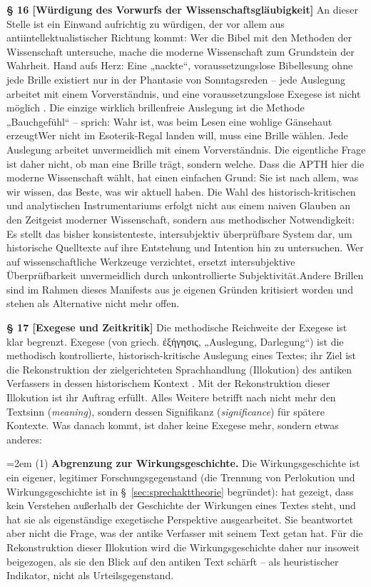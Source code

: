 \documentclass[11pt,a4paper]{article}
\makeatletter
\newcommand{\apth}{{\apthfont APTH}\hspace{0.15em}\xspace}
\newcommand{\subpar}[1]{%
  \begingroup
  \leftskip=2em %
  \noindent#1\par
  \endgroup
}
\newcommand{\apthsec}[3]{%
  \phantomsection%
  \def\@currentlabel{#1}%
  \label{sec:#3}%
  \textbf{§ #1 [#2]}%
}
\makeatother
\begin{document}
\apthsec{16}{Würdigung des Vorwurfs der Wissenschaftsgläubigkeit}{wissenschaftsglaeubigkeit} An dieser Stelle ist ein Einwand aufrichtig zu würdigen, der vor allem aus antiintellektualistischer Richtung kommt: Wer die Bibel mit den Methoden der Wissenschaft untersuche, mache die moderne Wissenschaft zum Grundstein der Wahrheit. Hand aufs Herz: Eine „nackte“, voraussetzungslose Bibellesung ohne jede Brille existiert nur in der Phantasie von Sonntagsreden – jede Auslegung arbeitet mit einem Vorverständnis, und eine voraussetzungslose Exegese ist nicht möglich \citep{bultmann1957,gadamer1960}. Die einzige wirklich brillenfreie Auslegung ist die Methode „Bauchgefühl“ – sprich: Wahr ist, was beim Lesen eine wohlige Gänsehaut erzeugt\textinterrobang\space Wer nicht im Esoterik-Regal landen will, muss eine Brille wählen. Jede Auslegung arbeitet unvermeidlich mit einem Vorverständnis. Die eigentliche Frage ist daher nicht, ob man eine Brille trägt, sondern welche. Dass die \apth hier die moderne Wissenschaft wählt, hat einen einfachen Grund: Sie ist nach allem, was wir wissen, das Beste, was wir aktuell haben. Die Wahl des historisch-kritischen und analytischen Instrumentariums erfolgt nicht aus einem naiven Glauben an den Zeitgeist moderner Wissenschaft, sondern aus methodischer Notwendigkeit: Es stellt das bisher konsistenteste, intersubjektiv überprüfbare System dar, um historische Quelltexte auf ihre Entstehung und Intention hin zu untersuchen. Wer auf wissenschaftliche Werkzeuge verzichtet, ersetzt intersubjektive Überprüfbarkeit unvermeidlich durch unkontrollierte Subjektivität.Andere Brillen sind im Rahmen dieses Manifests aus je eigenen Gründen kritisiert worden und stehen als Alternative nicht mehr offen.

\apthsec{17}{Exegese und Zeitkritik}{exegese-zeitkritik} Die methodische Reichweite der Exegese ist klar begrenzt. Exegese (von griech. ἐξήγησις, „Auslegung, Darlegung“) ist die methodisch kontrollierte, historisch-kritische Auslegung eines Textes; ihr Ziel ist die Rekonstruktion der zielgerichteten Sprachhandlung (Illokution) des antiken Verfassers in dessen historischem Kontext \citep{stuhlmacher1989}. Mit der Rekonstruktion dieser Illokution ist ihr Auftrag erfüllt. Alles Weitere betrifft nach \citet{hirsch1967} nicht mehr den Textsinn (\textit{meaning}), sondern dessen Signifikanz (\textit{significance}) für spätere Kontexte. Was danach kommt, ist daher keine Exegese mehr, sondern etwas anderes:

\subpar{(1) \textbf{Abgrenzung zur Wirkungsgeschichte.} Die Wirkungsgeschichte ist ein eigener, legitimer Forschungsgegenstand (die Trennung von Perlokution und Wirkungsgeschichte ist in §~\ref{sec:sprechakttheorie} begründet): \citet{gadamer1960} hat gezeigt, dass kein Verstehen außerhalb der Geschichte der Wirkungen eines Textes steht, und \citet{luz1985} hat sie als eigenständige exegetische Perspektive ausgearbeitet. Sie beantwortet aber nicht die Frage, was der antike Verfasser mit seinem Text getan hat. Für die Rekonstruktion dieser Illokution wird die Wirkungsgeschichte daher nur insoweit beigezogen, als sie den Blick auf den antiken Text schärft – als heuristischer Indikator, nicht als Urteilsgegenstand.}
\end{document}
